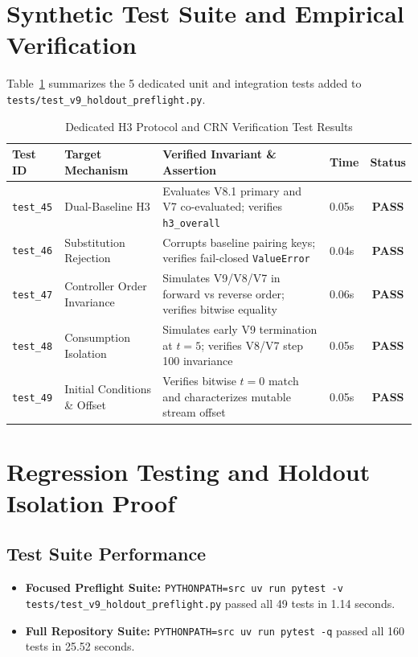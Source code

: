 \documentclass[10pt,a4paper]{article}
\begin{document}
\section{Synthetic Test Suite and Empirical Verification}

Table~\ref{tab:audit_tests} summarizes the 5 dedicated unit and integration tests added to \texttt{tests/test\_v9\_holdout\_preflight.py}.

\begin{table}[htbp]
\centering
\small
\caption{Dedicated H3 Protocol and CRN Verification Test Results}
\label{tab:audit_tests}
\begin{tabularx}{\textwidth}{llXlc}
\toprule
\textbf{Test ID} & \textbf{Target Mechanism} & \textbf{Verified Invariant \& Assertion} & \textbf{Time} & \textbf{Status} \\
\midrule
\texttt{test\_45} & Dual-Baseline H3 & Evaluates V8.1 primary and V7 co-evaluated; verifies \texttt{h3\_overall} & 0.05s & \textbf{PASS} \\
\texttt{test\_46} & Substitution Rejection & Corrupts baseline pairing keys; verifies fail-closed \texttt{ValueError} & 0.04s & \textbf{PASS} \\
\texttt{test\_47} & Controller Order Invariance & Simulates V9/V8/V7 in forward vs reverse order; verifies bitwise equality & 0.06s & \textbf{PASS} \\
\texttt{test\_48} & Consumption Isolation & Simulates early V9 termination at $t=5$; verifies V8/V7 step 100 invariance & 0.05s & \textbf{PASS} \\
\texttt{test\_49} & Initial Conditions \& Offset & Verifies bitwise $t=0$ match and characterizes mutable stream offset & 0.05s & \textbf{PASS} \\
\bottomrule
\end{tabularx}
\end{table}

\section{Regression Testing and Holdout Isolation Proof}

\subsection{Test Suite Performance}
\begin{itemize}
    \item \textbf{Focused Preflight Suite:} \texttt{PYTHONPATH=src uv run pytest -v tests/test\_v9\_holdout\_preflight.py} passed all 49 tests in 1.14 seconds.
    \item \textbf{Full Repository Suite:} \texttt{PYTHONPATH=src uv run pytest -q} passed all 160 tests in 25.52 seconds.
\end{itemize}
\end{document}
